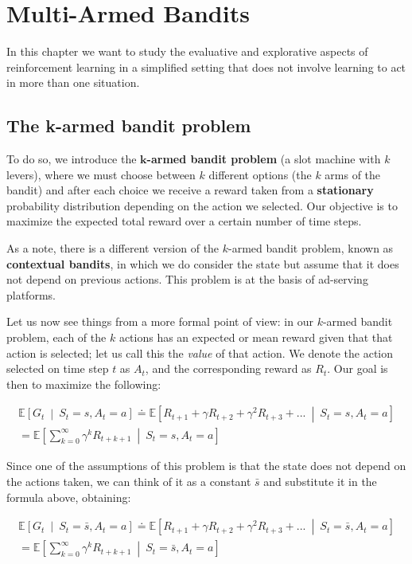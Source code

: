 \chapter{Multi-Armed Bandits}
In this chapter we want to study the evaluative and explorative aspects of reinforcement learning in a simplified setting that does not involve learning to act in more than one situation.

\section{The k-armed bandit problem}
To do so, we introduce the \textbf{$\boldsymbol{k}$-armed bandit problem} (a slot machine with $k$ levers), where we must choose between $k$ different options (the $k$ arms of the bandit) and after each choice we receive a reward taken from a \textbf{stationary} probability distribution depending on the action we selected. Our objective is to maximize the expected total reward over a certain number of time steps.

As a note, there is a different version of the $k$-armed bandit problem, known as \textbf{contextual bandits}, in which we do consider the state but assume that it does not depend on previous actions. This problem is at the basis of ad-serving platforms.

Let us now see things from a more formal point of view: in our $k$-armed bandit problem, each of the $k$ actions has an expected or mean reward given that that action is selected; let us call this the \textit{value} of that action. We denote the action selected on time step $t$ as $A_t$, and the corresponding reward as $R_t$. Our goal is then to maximize the following:

\begin{gather*}
    \mathbb{E} \left[ G_t \  \middle\vert \  S_t = s, A_t = a \right] \doteq \mathbb{E} \left[ R_{t+1} + \gamma R_{t+2} + \gamma^2 R_{t+3} + ... \  \middle\vert \  S_t = s, A_t = a \right] \\
    = \mathbb{E} \left[ \sum_{k=0}^{\infty} \gamma^k R_{t+k+1} \  \middle\vert \  S_t = s, A_t = a \right]
\end{gather*}

Since one of the assumptions of this problem is that the state does not depend on the actions taken, we can think of it as a constant $\bar{s}$ and substitute it in the formula above, obtaining:

\begin{gather*}
    \mathbb{E} \left[ G_t \  \middle\vert \  S_t = \bar{s}, A_t = a \right] \doteq \mathbb{E} \left[ R_{t+1} + \gamma R_{t+2} + \gamma^2 R_{t+3} + ... \  \middle\vert \  S_t = \bar{s}, A_t = a \right] \\
    = \mathbb{E} \left[ \sum_{k=0}^{\infty} \gamma^k R_{t+k+1} \  \middle\vert \  S_t = \bar{s}, A_t = a \right]
\end{gather*}

